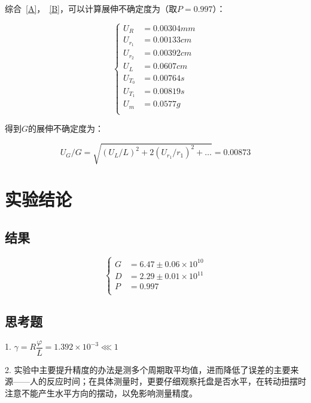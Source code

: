 \documentclass[a4paper]{ltxdoc}
\begin{document}
\begin{multicols}{2}
  综合~\ref{A}，~\ref{B}，可以计算展伸不确定度为（取$P=0.997$）：

  \begin{equation}
    \left\{
    \begin{aligned}
      U_{R}   & = 0.00304 mm \\
      U_{r_1} & = 0.00133 cm \\
      U_{r_2} & = 0.00392 cm \\
      U_{L}   & = 0.0607 cm  \\
      U_{T_0} & = 0.00764 s  \\
      U_{T_1} & = 0.00819 s  \\
      U_{m}   & = 0.0577 g   \\
    \end{aligned}
    \right.
  \end{equation}

  得到$G$的展伸不确定度为：

  \begin{equation}
    U_G/G = \sqrt{(U_L/L)^2 + 2 (U_{r_1}/r_1) ^2 +\ldots} = 0.00873
  \end{equation}

  \section{实验结论}

  \subsection{结果}
  \begin{equation}
    \left\{
    \begin{aligned}
      G & = 6.47 \pm 0.06 \times 10^{10} \\
      D & = 2.29 \pm 0.01 \times 10^{11} \\
      P & = 0.997                        \\
    \end{aligned}
    \right.
  \end{equation}

  \subsection{思考题}
  1. $\gamma = R \dfrac{\varphi}{L} = 1.392 \times 10 ^{-3} \lll 1$

  2. 实验中主要提升精度的办法是测多个周期取平均值，进而降低了误差的主要来源——人的反应时间；在具体测量时，更要仔细观察托盘是否水平，在转动扭摆时注意不能产生水平方向的摆动，以免影响测量精度。
\end{multicols}
\end{document}
